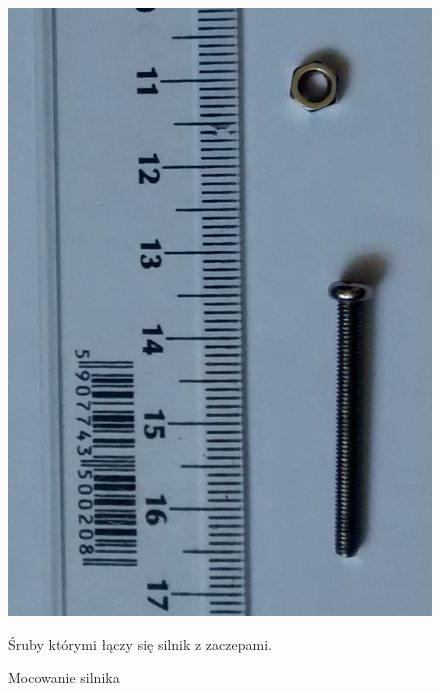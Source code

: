 \documentclass[a4paper,11pt]{article}
\def\SCALE{0.6}
\begin{document}
\begin{figure}[H]
	\centering
	\includegraphics[width=\SCALE
	\paperwidth]{mocowanieSilnika}
	\caption{Mocowanie silnika}
	Śruby którymi łączy się silnik z zaczepami.
\end{figure}	
\end{document}
